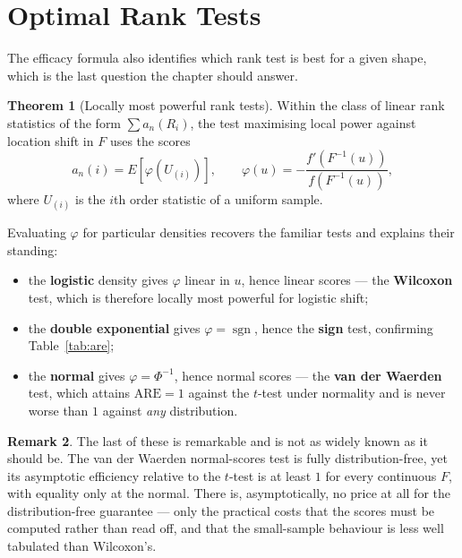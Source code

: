\documentclass[12pt,a4paper]{report}
\theoremstyle{definition}
\newtheorem{thm}{Theorem}[section]
\newtheorem{remark}[thm]{Remark}
\theoremstyle{plain}
\begin{document}
\section{Optimal Rank Tests}

The efficacy formula also identifies which rank test is best for a given shape,
which is the last question the chapter should answer.

\begin{thm}[Locally most powerful rank tests]
Within the class of linear rank statistics of the form
$\sum a_n(R_i)$, the test maximising local power against location shift in $F$
uses the scores
$$a_n(i) = E\left[\varphi\left(U_{(i)}\right)\right],\qquad
\varphi(u) = -\frac{f'\left(F^{-1}(u)\right)}{f\left(F^{-1}(u)\right)} ,$$
where $U_{(i)}$ is the $i$th order statistic of a uniform sample.
\end{thm}

Evaluating $\varphi$ for particular densities recovers the familiar tests and
explains their standing:

\begin{itemize}
\item[$\bullet$] the \textbf{logistic} density gives $\varphi$ linear in $u$,
hence linear scores --- the \textbf{Wilcoxon} test, which is therefore locally
most powerful for logistic shift;
\item[$\bullet$] the \textbf{double exponential} gives $\varphi = \operatorname{sgn}$,
hence the \textbf{sign} test, confirming Table~\ref{tab:are};
\item[$\bullet$] the \textbf{normal} gives $\varphi = \Phi^{-1}$, hence normal
scores --- the \textbf{van der Waerden} test, which attains
$\mathrm{ARE} = 1$ against the $t$-test under normality and is never worse than
$1$ against \emph{any} distribution.
\end{itemize}

\begin{remark}
The last of these is remarkable and is not as widely known as it should be. The
van der Waerden normal-scores test is fully distribution-free, yet its
asymptotic efficiency relative to the $t$-test is at least $1$ for every
continuous $F$, with equality only at the normal. There is, asymptotically, no
price at all for the distribution-free guarantee --- only the practical costs
that the scores must be computed rather than read off, and that the small-sample
behaviour is less well tabulated than Wilcoxon's.
\end{remark}
\end{document}

